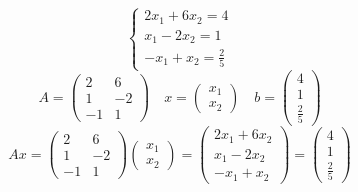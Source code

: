 \documentclass[a4paper]{article}
\theoremstyle{break}
\theoremstyle{break}
\theoremstyle{break}
\theoremstyle{break}
\begin{document}
\begin{figure}[H]
  \begin{example}
    \[
    \begin{cases}
      2x_1 + 6x_2 = 4\\
      x_1 - 2x_2 = 1\\
      -x_1 + x_2 = \frac{2}{5}
    \end{cases}
    \] 
    \[
    A = 
    \begin{pmatrix} 
      2 & 6 \\
      1 & -2 \\
      -1 & 1
    \end{pmatrix} 
    \quad
    x = \begin{pmatrix} 
      x_1\\
      x_2
    \end{pmatrix} 
    \quad
    b = \begin{pmatrix} 
      4\\
      1\\
      \frac{2}{5}
    \end{pmatrix} 
    \] 
    \[
    Ax = \begin{pmatrix} 
      2 & 6\\
      1 & -2\\
      -1 & 1
    \end{pmatrix} 
    \begin{pmatrix} 
      x_1\\
      x_2
    \end{pmatrix} 
    =
    \begin{pmatrix} 
      2x_1 + 6x_2\\
      x_1 - 2x_2\\
      -x_1 + x_2
    \end{pmatrix}
    =
    \begin{pmatrix} 
      4\\
      1\\
      \frac{2}{5}
    \end{pmatrix} 
    \] 
  \end{example}
\end{figure}
\end{document}
